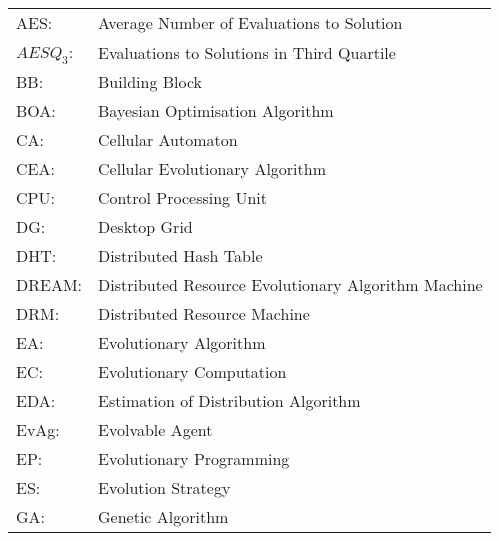 \begin{tabular*}{\textwidth}
{@{\extracolsep{\fill}}ll}
AES:		&	Average Number of Evaluations to Solution\\

$AESQ_3$:&	Evaluations to Solutions in Third Quartile\\

BB:		&	Building Block\\

BOA:	&	Bayesian Optimisation Algorithm\\

CA:		&	Cellular Automaton \\

CEA:	&	Cellular Evolutionary Algorithm \\

CPU:	&	Control Processing Unit\\

DG:		&	Desktop Grid\\

DHT:	&	Distributed Hash Table\\

DREAM:	& 	Distributed Resource Evolutionary Algorithm Machine\\

DRM:	&	Distributed Resource Machine\\

EA:		&	Evolutionary Algorithm \\

EC:		&	Evolutionary Computation \\

EDA:	&	Estimation of Distribution Algorithm\\

EvAg:	&	Evolvable Agent \\

EP:		&	Evolutionary Programming \\

ES:		&	Evolution Strategy \\

GA:		&	Genetic Algorithm \\




\end{tabular*}
\bigskip
